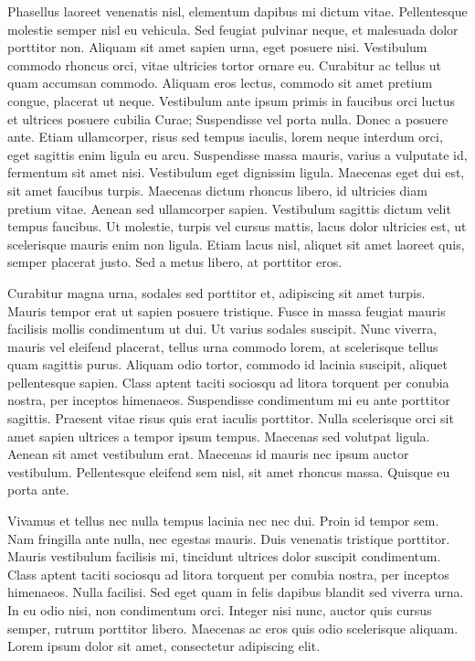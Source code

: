 Phasellus laoreet venenatis nisl, elementum dapibus mi dictum vitae.
Pellentesque molestie semper nisl eu vehicula.
Sed feugiat pulvinar neque, et malesuada dolor porttitor non.
Aliquam sit amet sapien urna, eget posuere nisi.
Vestibulum commodo rhoncus orci, vitae ultricies tortor ornare eu.
Curabitur ac tellus ut quam accumsan commodo.
Aliquam eros lectus, commodo sit amet pretium congue, placerat ut neque.
Vestibulum ante ipsum primis in faucibus orci luctus et ultrices posuere cubilia Curae; Suspendisse vel porta nulla.
Donec a posuere ante.
Etiam ullamcorper, risus sed tempus iaculis, lorem neque interdum orci, eget sagittis enim ligula eu arcu.
Suspendisse massa mauris, varius a vulputate id, fermentum sit amet nisi.
Vestibulum eget dignissim ligula.
Maecenas eget dui est, sit amet faucibus turpis.
Maecenas dictum rhoncus libero, id ultricies diam pretium vitae.
Aenean sed ullamcorper sapien.
Vestibulum sagittis dictum velit tempus faucibus.
Ut molestie, turpis vel cursus mattis, lacus dolor ultricies est, ut scelerisque mauris enim non ligula.
Etiam lacus nisl, aliquet sit amet laoreet quis, semper placerat justo.
Sed a metus libero, at porttitor eros.

Curabitur magna urna, sodales sed porttitor et, adipiscing sit amet turpis.
Mauris tempor erat ut sapien posuere tristique.
Fusce in massa feugiat mauris facilisis mollis condimentum ut dui.
Ut varius sodales suscipit.
Nunc viverra, mauris vel eleifend placerat, tellus urna commodo lorem, at scelerisque tellus quam sagittis purus.
Aliquam odio tortor, commodo id lacinia suscipit, aliquet pellentesque sapien.
Class aptent taciti sociosqu ad litora torquent per conubia nostra, per inceptos himenaeos.
Suspendisse condimentum mi eu ante porttitor sagittis.
Praesent vitae risus quis erat iaculis porttitor.
Nulla scelerisque orci sit amet sapien ultrices a tempor ipsum tempus.
Maecenas sed volutpat ligula.
Aenean sit amet vestibulum erat.
Maecenas id mauris nec ipsum auctor vestibulum.
Pellentesque eleifend sem nisl, sit amet rhoncus massa.
Quisque eu porta ante.

Vivamus et tellus nec nulla tempus lacinia nec nec dui.
Proin id tempor sem.
Nam fringilla ante nulla, nec egestas mauris.
Duis venenatis tristique porttitor.
Mauris vestibulum facilisis mi, tincidunt ultrices dolor suscipit condimentum.
Class aptent taciti sociosqu ad litora torquent per conubia nostra, per inceptos himenaeos.
Nulla facilisi.
Sed eget quam in felis dapibus blandit sed viverra urna.
In eu odio nisi, non condimentum orci.
Integer nisi nunc, auctor quis cursus semper, rutrum porttitor libero.
Maecenas ac eros quis odio scelerisque aliquam.
Lorem ipsum dolor sit amet, consectetur adipiscing elit.

